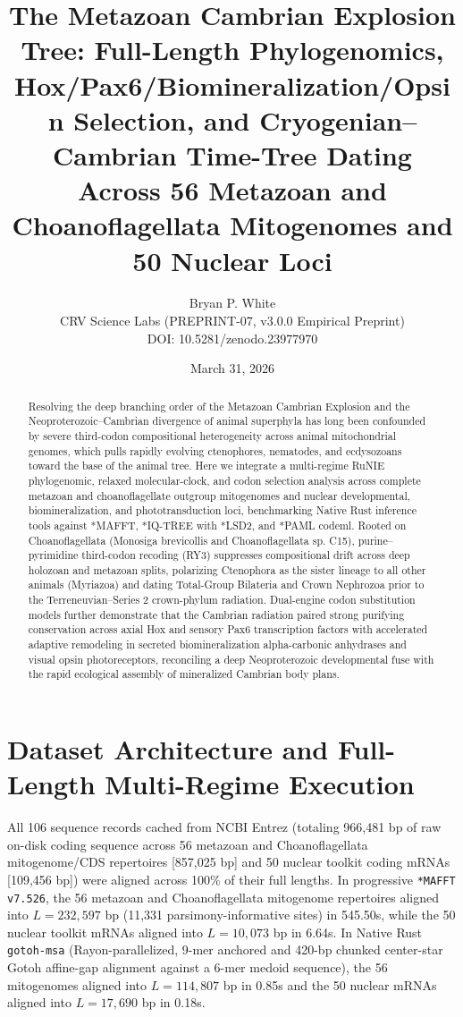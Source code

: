 \documentclass[10pt,letterpaper]{article}
\title{The Metazoan Cambrian Explosion Tree: Full-Length Phylogenomics, Hox/Pax6/Biomineralization/Opsin Selection, and Cryogenian–Cambrian Time-Tree Dating Across 56 Metazoan and Choanoflagellata Mitogenomes and 50 Nuclear Loci}
\author{Bryan P. White \\ CRV Science Labs (PREPRINT-07, v3.0.0 Empirical Preprint) \\ DOI: 10.5281/zenodo.23977970}
\date{March 31, 2026}
\begin{document}
\maketitle

\begin{abstract}
Resolving the deep branching order of the Metazoan Cambrian Explosion and the Neoproterozoic–Cambrian divergence of animal superphyla has long been confounded by severe third-codon compositional heterogeneity across animal mitochondrial genomes, which pulls rapidly evolving ctenophores, nematodes, and ecdysozoans toward the base of the animal tree. Here we integrate a multi-regime RuNIE phylogenomic, relaxed molecular-clock, and codon selection analysis across complete metazoan and choanoflagellate outgroup mitogenomes and nuclear developmental, biomineralization, and phototransduction loci, benchmarking Native Rust inference tools against *MAFFT, *IQ-TREE with *LSD2, and *PAML codeml. Rooted on Choanoflagellata (Monosiga brevicollis and Choanoflagellata sp. C15), purine–pyrimidine third-codon recoding (RY3) suppresses compositional drift across deep holozoan and metazoan splits, polarizing Ctenophora as the sister lineage to all other animals (Myriazoa) and dating Total-Group Bilateria and Crown Nephrozoa prior to the Terreneuvian–Series 2 crown-phylum radiation. Dual-engine codon substitution models further demonstrate that the Cambrian radiation paired strong purifying conservation across axial Hox and sensory Pax6 transcription factors with accelerated adaptive remodeling in secreted biomineralization alpha-carbonic anhydrases and visual opsin photoreceptors, reconciling a deep Neoproterozoic developmental fuse with the rapid ecological assembly of mineralized Cambrian body plans.
\end{abstract}

\section{Dataset Architecture and Full-Length Multi-Regime Execution}
All 106 sequence records cached from NCBI Entrez (totaling 966,481 bp of raw on-disk coding sequence across 56 metazoan and Choanoflagellata mitogenome/CDS repertoires [857,025 bp] and 50 nuclear toolkit coding mRNAs [109,456 bp]) were aligned across 100\% of their full lengths. In progressive \texttt{*MAFFT v7.526}, the 56 metazoan and Choanoflagellata mitogenome repertoires aligned into $L = 232,597$ bp (11,331 parsimony-informative sites) in 545.50s, while the 50 nuclear toolkit mRNAs aligned into $L = 10,073$ bp in 6.64s. In Native Rust \texttt{gotoh-msa} (Rayon-parallelized, 9-mer anchored and 420-bp chunked center-star Gotoh affine-gap alignment against a 6-mer medoid sequence), the 56 mitogenomes aligned into $L = 114,807$ bp in 0.85s and the 50 nuclear mRNAs aligned into $L = 17,690$ bp in 0.18s.
\end{document}
